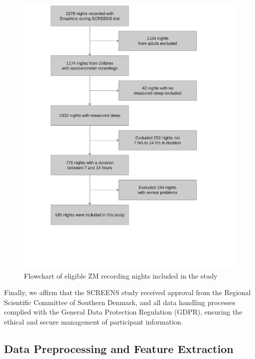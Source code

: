 \documentclass[
  super,
  preprint,
  3p]{elsarticle}
\begin{document}
\begin{figure}[b]

{\centering \includegraphics{visuals/flowchart_of_elligible_nights.pdf}

}

\caption{\label{fig-flow}Flowchart of eligible ZM recording nights
included in the study}

\end{figure}

Finally, we affirm that the SCREENS study received approval from the
Regional Scientific Committee of Southern Denmark, and all data handling
processes complied with the General Data Protection Regulation (GDPR),
ensuring the ethical and secure management of participant information.

\hypertarget{data-preprocessing-and-feature-extraction}{%
\subsection{Data Preprocessing and Feature
Extraction}\label{data-preprocessing-and-feature-extraction}}
\end{document}
